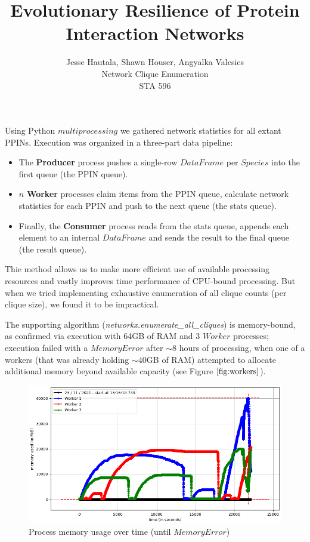 \documentclass[12pt]{article}
\title{\textbf{Evolutionary Resilience of Protein Interaction Networks}}
\author{Jesse Hautala, Shawn Houser, Angyalka Valcsics \\ Network Clique Enumeration \\ STA 596}
\begin{document}
\maketitle

Using Python $multiprocessing$ we gathered network statistics for all extant PPINs. Execution was organized in a three-part data pipeline:
\begin{itemize}
    \item The \textbf{Producer} process pushes a single-row $DataFrame$ per $Species$ into the first queue (the PPIN queue).
    \item $n$ \textbf{Worker} processes claim items from the PPIN queue, calculate network statistics for each PPIN and push to the next queue (the stats queue).
    \item Finally, the \textbf{Consumer} process reads from the stats queue, appends each element to an internal $DataFrame$ and sends the result to the final queue (the result queue).
\end{itemize}

Thie method allows us to make more efficient use of available processing resources and vastly improves time performance of CPU-bound processing. But when we tried implementing exhaustive enumeration of all clique counts (per clique size), we found it to be impractical.

The supporting algorithm (\textit{networkx.enumerate\_all\_cliques}) is memory-bound, as confirmed via execution with 64GB of RAM and 3 $Worker$ processes; execution failed with a $MemoryError$ after $\sim8$ hours of processing, when one of a workers (that was already holding $\sim40$GB of RAM) attempted to allocate additional memory beyond available capacity (see Figure $\ref{fig:workers}$).

\begin{figure}[!htbp]
    \centering
    \includegraphics[scale=.5]{workers}
    \caption{Process memory usage over time (until $MemoryError$)}
    \label{fig:workers}
\end{figure}
\end{document}
